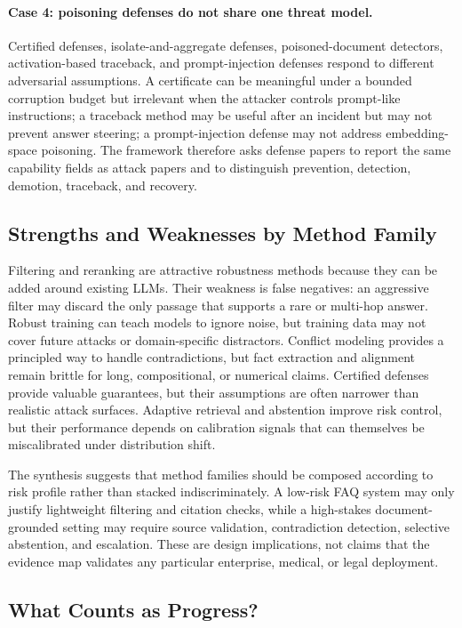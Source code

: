 \documentclass[11pt]{article}
\begin{document}
\paragraph{Case 4: poisoning defenses do not share one threat model.}
Certified defenses, isolate-and-aggregate defenses, poisoned-document detectors, activation-based traceback, and prompt-injection defenses respond to different adversarial assumptions. A certificate can be meaningful under a bounded corruption budget but irrelevant when the attacker controls prompt-like instructions; a traceback method may be useful after an incident but may not prevent answer steering; a prompt-injection defense may not address embedding-space poisoning. The framework therefore asks defense papers to report the same capability fields as attack papers and to distinguish prevention, detection, demotion, traceback, and recovery.

\subsection{Strengths and Weaknesses by Method Family}

Filtering and reranking are attractive robustness methods because they can be added around existing LLMs. Their weakness is false negatives: an aggressive filter may discard the only passage that supports a rare or multi-hop answer. Robust training can teach models to ignore noise, but training data may not cover future attacks or domain-specific distractors. Conflict modeling provides a principled way to handle contradictions, but fact extraction and alignment remain brittle for long, compositional, or numerical claims. Certified defenses provide valuable guarantees, but their assumptions are often narrower than realistic attack surfaces. Adaptive retrieval and abstention improve risk control, but their performance depends on calibration signals that can themselves be miscalibrated under distribution shift.

The synthesis suggests that method families should be composed according to risk profile rather than stacked indiscriminately. A low-risk FAQ system may only justify lightweight filtering and citation checks, while a high-stakes document-grounded setting may require source validation, contradiction detection, selective abstention, and escalation. These are design implications, not claims that the evidence map validates any particular enterprise, medical, or legal deployment.

\subsection{What Counts as Progress?}
\end{document}
